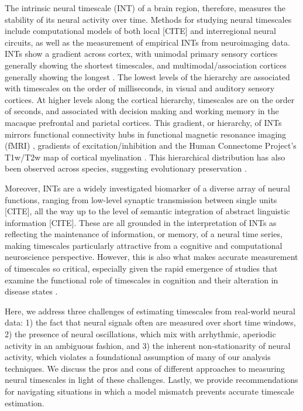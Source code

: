 \documentclass[pdflatex,sn-mathphys-num]{sn-jnl}
\begin{document}
The intrinsic neural timescale (INT) of a brain region, therefore, measures the stability of its neural activity over time. Methods for studying neural timescales include computational models of both local [CITE] and interregional \cite{chaudhuri_large-scale_2015} neural circuits, as well as the measurement of empirical INTs from neuroimaging data. INTs show a gradient across cortex, with unimodal primary sensory cortices generally showing the shortest timescales, and multimodal/association cortices generally showing the longest \cite{hasson_hierarchy_2008, kiebel_hierarchy_2008, murray_hierarchy_2014, gao_neuronal_2020, misic_brain_2010}. The lowest levels of the hierarchy are associated with timescales on the order of milliseconds, in visual \cite{buracas_efficient_1998} and auditory \cite{yang_millisecond-scale_2008} sensory cortices. At higher levels along the cortical hierarchy, timescales are on the order of seconds, and associated with decision making \cite{brody_timing_2003} and working memory \cite{wang_probabilistic_2002} in the macaque prefrontal and parietal cortices. This gradient, or hierarchy, of INTs mirrors functional connectivity hubs in functional magnetic resonance imaging (fMRI) \cite{ito_cortical_2020, raut_organization_2020}, gradients of excitation/inhibition \cite{gao_neuronal_2020, wang_macroscopic_2020} and the Human Connectome Project’s T1w/T2w map of cortical myelination \cite{gao_neuronal_2020}. This hierarchical distribution has also been observed across species, suggesting evolutionary preservation \cite{buzsaki_scaling_2013}. 

Moreover, INTs are a widely investigated biomarker of a diverse array of neural functions, ranging from low-level synaptic transmission between single units [CITE], all the way up to the level of semantic integration of abstract linguistic information [CITE]. These are all grounded in the interpretation of INTs as reflecting the maintenance of information, or memory, of a neural time series, making timescales particularly attractive from a cognitive and computational neuroscience perspective. However, this is also what makes accurate measurement of timescales so critical, especially given the rapid emergence of studies that examine the functional role of timescales in cognition \cite{cavanagh_diversity_2020, gao_neuronal_2020} and their alteration in disease states \cite{watanabe_atypical_2019, wengler_distinct_2020}.

Here, we address three challenges of estimating timescales from real-world neural data: 1) the fact that neural signals often are measured over short time windows, 2) the presence of neural oscillations, which mix with arrhythmic, aperiodic activity in an ambiguous fashion, and 3) the inherent non-stationarity of neural activity, which violates a foundational assumption of many of our analysis techniques. We discuss the pros and cons of different approaches to measuring neural timescales in light of these challenges. Lastly, we provide recommendations for navigating situations in which a model mismatch prevents accurate timescale estimation. 
\end{document}
